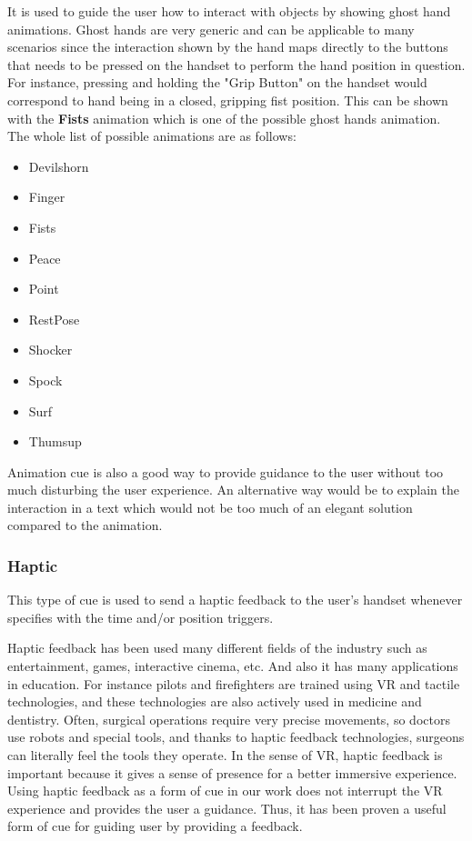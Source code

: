 \documentclass[conference]{IEEEtran}
\begin{document}
It is used to guide the user how to interact with objects by showing ghost hand animations.  Ghost hands are very generic and can be applicable to many scenarios since the interaction shown by the hand maps directly to the buttons that needs to be pressed on the handset to perform the hand position in question. For instance, pressing  and holding the "Grip Button" on the handset would correspond to hand being in a closed, gripping fist position. This can be shown with the \textbf{Fists} animation which is one of the possible ghost hands animation. The whole list of possible animations are as follows:
\begin{itemize}
    \item Devilshorn
    \item Finger
    \item Fists
    \item Peace
    \item Point
    \item RestPose
    \item Shocker
    \item Spock
    \item Surf
    \item Thumsup
\end{itemize}

Animation cue is also a good way to provide guidance to the user without too much disturbing the user experience. An alternative way would be to explain the interaction in a text which would not be too much of an elegant solution compared to the animation.

\subsubsection{Haptic}

This type of cue is used to send a haptic feedback to the user's handset whenever specifies with the time and/or position triggers.

Haptic feedback has been used many different fields of the industry such as entertainment, games, interactive cinema, etc. And also it has many applications in education. For instance pilots and firefighters are trained using VR and tactile technologies, and these technologies are also actively used in medicine and dentistry. Often, surgical operations require very precise movements, so doctors use robots and special tools, and thanks to haptic feedback technologies, surgeons can literally feel the tools they operate. \cite{antoshchenko_2020} In the sense of VR, haptic feedback is important because it gives a sense of presence for a better immersive experience. Using haptic feedback as a form of cue in our work does not interrupt the VR experience and provides the user a guidance. Thus, it has been proven a useful form of cue for guiding user by providing a feedback. 
\end{document}
